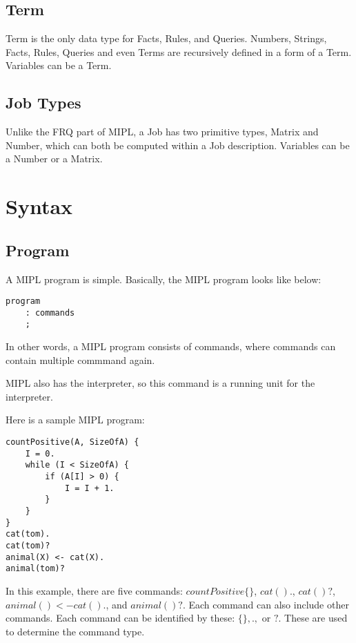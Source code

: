 \documentclass[prodmode,acmtecs]{acmsmall}
\begin{document}
\subsection {Term}
Term is the only data type for Facts, Rules, and Queries.  Numbers, Strings,
Facts, Rules, Queries and even Terms are recursively defined in a form of a Term. 
Variables can be a Term.
\medskip

\subsection {Job Types}
Unlike the FRQ part of MIPL, a Job has two primitive types, Matrix and
Number, which can both be computed within a Job description. Variables
can be a Number or a Matrix.

\section{Syntax}

\subsection{Program}

A MIPL program is simple. Basically, the MIPL program looks like below:

\begin{lstlisting}
program
	: commands
	;
\end{lstlisting}

In other words, a MIPL program consists of commands, where commands can contain multiple 
commmand again.

MIPL also has the interpreter, so this command is a running unit for the interpreter.

Here is a sample MIPL program:

\begin{lstlisting}
countPositive(A, SizeOfA) {
    I = 0.
    while (I < SizeOfA) {
        if (A[I] > 0) {
            I = I + 1.
        }
    }
}
cat(tom).
cat(tom)?
animal(X) <- cat(X).
animal(tom)?
\end{lstlisting}

In this example, there are five commands:
 $countPositive\{\}$, $cat().$, $cat()?$, $animal() <- cat().$, and $animal()?$. Each
 command can also include other commands. Each command can be identified by these:
 $\{\}, .,$ or $?$. These are used to determine the command type.
\medskip
\end{document}
